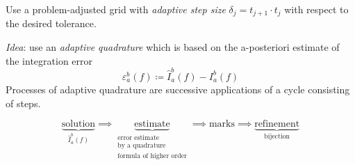 \documentclass[a4paper]{article}
\numberwithin{lecref}{section}
\theoremstyle{break}
\begin{document}
Use a problem-adjusted grid with \emph{adaptive step size} $\delta_j = t_{j+1} \cdot t_j$ with respect to the desired tolerance.

\emph{Idea}: use an \emph{adaptive quadrature} which is based on the a-posteriori estimate of the integration error
\[ \varepsilon_a^b(f) \coloneqq \hat{I}_a^b(f) - I_a^b(f) \]
Processes of adaptive quadrature are successive applications of a cycle consisting of steps.

\[
  \underbrace{\text{solution}}_{\hat{I}_a^b(f)}
    \implies \underbrace{\text{estimate}}_{\substack{\text{error estimate} \\ \text{by a quadrature} \\ \text{formula of higher order}}}
    \implies \text{marks}
    \implies \underbrace{\text{refinement}}_{\text{bijection}}
\]



\printindex
\end{document}
